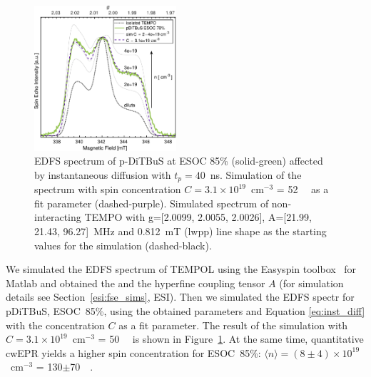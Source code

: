 \begin{figure}[ht]
\center
	\includegraphics[width=0.47\textwidth]{./pulse/figures/Figure_4.pdf}
	\caption{EDFS spectrum of p-DiTBuS at ESOC 85\% (solid-green) affected by instantaneous diffusion with $t_p=40$~ns. Simulation of the spectrum with spin concentration $C=3.1\times10^{19}$~cm$^{-3}$ = 52~\si{\milli\Molar}  as a fit parameter (dashed-purple). Simulated spectrum of non-interacting TEMPO with g=[2.0099, 2.0055, 2.0026], A=[21.99, 21.43, 96.27]~MHz and 0.812~mT (lwpp)  line shape as the starting values for the simulation (dashed-black). }
	\label{fig:Figure_4}
\end{figure}

We simulated the  EDFS spectrum of TEMPOL using the Easyspin toolbox~\cite{Stoll2006} for Matlab and obtained the   and the hyperfine coupling tensor $A$ (for simulation details see Section~\ref{esi:fse_sims}, ESI). Then we simulated the EDFS spectr for pDiTBuS, ESOC~85\%, using the obtained parameters and Equation \ref{eq:inst_diff} with  the concentration $C$ as a fit parameter. The result of the simulation with $C=3.1\times10^{19}$~cm$^{-3}$ = 50~\si{\milli\Molar}  is shown in Figure~\ref{fig:Figure_4}. At the same time, quantitative cwEPR yields a higher spin concentration for ESOC~85\%: $\langle n\rangle = (8\pm4)\times10^{19}$~cm$^{-3}$ = 130$\pm$70~\si{\milli\Molar}.\\

